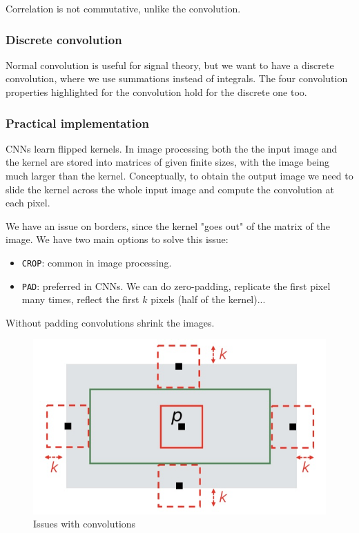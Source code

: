 Correlation is not commutative, unlike the convolution.

\subsubsection{Discrete convolution}

Normal convolution is useful for signal theory, but we want to have a discrete convolution, where we use summations instead of integrals.
The four convolution properties highlighted for the convolution hold for the discrete one too.

\subsubsection{Practical implementation}
CNNs learn flipped kernels.
In image processing both the the input image and the kernel are stored into matrices of given finite sizes, with the image being much larger than the kernel.
Conceptually, to obtain the output image we need to slide the kernel across the whole input image and compute the convolution at each pixel.

We have an issue on borders, since the kernel "goes out" of the matrix of the image.
We have two main options to solve this issue:
\begin{itemize}
  \item \verb|CROP|: common in image processing.
  \item \verb|PAD|: preferred in CNNs. We can do zero-padding, replicate the first pixel many times, reflect the first $k$ pixels (half of the kernel)...
\end{itemize}

Without padding convolutions shrink the images.

\begin{figure}[htbp]
  \centering
  \includegraphics[width=0.7\linewidth]{./img/convolution_visualization.jpg}
  \caption{Issues with convolutions}
  \label{fig:convolution_visualization}
\end{figure}

